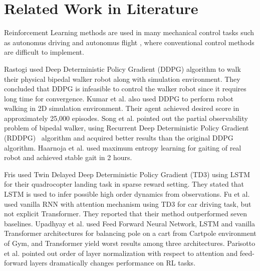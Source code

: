 \section{Related Work in Literature}
\label{sec:related_work}

Reinforcement Learning methods are used in many mechanical control tasks 
such as autonomus driving \cite{pan_virtual_2017, shalev-shwartz_safe_2016, sallab_deep_2017, wang_deep_2019} 
and autonomus flight \cite{kopsa_reinforcement_2018, abbeel_application_2006, santos_experimental_2012}, where conventional control methods are difficult to implement.

Rastogi \cite{rastogi_deep_2017} used Deep Deterministic Policy Gradient (DDPG) algorithm to walk 
their physical bipedal walker robot along with simulation environment. 
They concluded that DDPG is infeasible to control the walker robot 
since it requires long time for convergence. 
Kumar et al. \cite{kumar_bipedal_2018} also used DDPG to perform 
robot walking in 2D simulation environment. 
Their agent achieved desired score in approximately 25,000 episodes. 
Song et al. \cite{song_recurrent_2018} pointed out the partial observability problem of bipedal walker, 
using Recurrent Deep Deterministic Policy Gradient (RDDPG)~\cite{heess_memory-based_2015} algorithm 
and acquired better results than the original DDPG algorithm. 
Haarnoja et al. \cite{haarnoja_learning_2019} used maximum entropy learning for gaiting of real robot and achieved stable gait in 2 hours. 

Fris \cite{fris_landing_2020} used Twin Delayed Deep Deterministic Policy Gradient (TD3) using LSTM for their quadrocopter landing task in sparse reward setting.
They stated that LSTM is used to infer possible high order dynamics from observations.  
Fu et al. \cite{fu_when_2020} used vanilla RNN with attention mechanism 
using TD3 for car driving task, but not explicit Transformer. 
They reported that their method outperformed seven baselines. 
Upadhyay et al. \cite{upadhyay_transformer_2019} used Feed Forward Neural Network, 
LSTM and vanilla Transformer architectures for balancing pole 
on a cart from Cartpole environment of Gym, and Transformer yield worst results among three architectures. 
Parisotto et al. \cite{parisotto_stabilizing_2019} pointed out order of layer normalization with respect to attention and feed-forward layers dramatically changes performance on RL tasks.
 